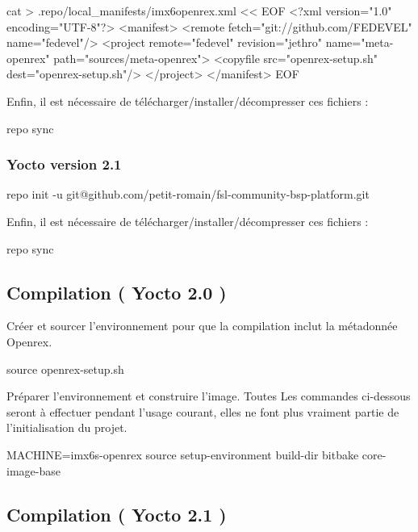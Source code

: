 	\begin{tcolorbox}
		cat > .repo/local\_manifests/imx6openrex.xml << EOF
		<?xml version="1.0" encoding="UTF-8"?>
		<manifest>
		<remote fetch="git://github.com/FEDEVEL" name="fedevel"/>
		<project remote="fedevel" revision="jethro" name="meta-openrex" path="sources/meta-openrex">
		<copyfile src="openrex-setup.sh" dest="openrex-setup.sh"/>
		</project>
		</manifest>
		EOF
	\end{tcolorbox}

	Enfin, il est nécessaire de télécharger/installer/décompresser ces fichiers :

	\begin{tcolorbox}
		repo sync
	\end{tcolorbox}

	\subsubsection{Yocto version 2.1}
	\begin{tcolorbox}
		repo init -u git@github.com/petit-romain/fsl-community-bsp-platform.git
	\end{tcolorbox}

	Enfin, il est nécessaire de télécharger/installer/décompresser ces fichiers :

	\begin{tcolorbox}
		repo sync
	\end{tcolorbox}

	\subsection{Compilation ( Yocto 2.0 )}
	Créer et sourcer l'environnement pour que la compilation inclut la métadonnée Openrex.

	\begin{tcolorbox}
		source openrex-setup.sh
	\end{tcolorbox}

	Préparer l’environnement et construire l’image. Toutes Les commandes ci-dessous seront à effectuer pendant l’usage courant, elles ne font plus vraiment partie de l’initialisation du projet.


	\begin{tcolorbox}
		MACHINE=imx6s-openrex source setup-environment build-dir
		bitbake core-image-base
	\end{tcolorbox}

	\subsection{Compilation ( Yocto 2.1 )}

